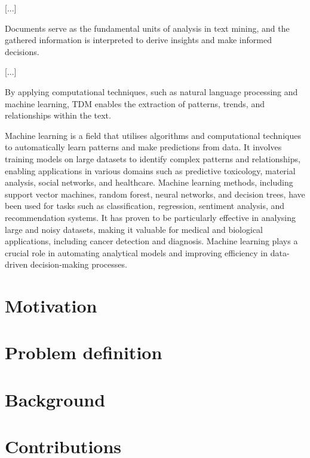 \documentclass[12pt, a4paper]{report}
\begin{document}
[...]

Documents serve as the fundamental units of analysis in text mining, and the gathered information is interpreted to derive insights and make informed decisions.

[...]

By applying computational techniques, such as natural language processing and machine learning, TDM enables the extraction of patterns, trends, and relationships within the text.


Machine learning is a field that utilises algorithms and computational techniques to automatically learn patterns and make predictions from data. 
It involves training models on large datasets to identify complex patterns and relationships, enabling applications in various domains such as predictive toxicology, material analysis, social networks, and healthcare. Machine learning methods, including support vector machines, random forest, neural networks, and decision trees, have been used for tasks such as classification, regression, sentiment analysis, and recommendation systems. 
It has proven to be particularly effective in analysing large and noisy datasets, making it valuable for medical and biological applications, including cancer detection and diagnosis. Machine learning plays a crucial role in automating analytical models and improving efficiency in data-driven decision-making processes.




\section{Motivation}
\section{Problem definition}
\section{Background}
\section{Contributions}



\end{document}
